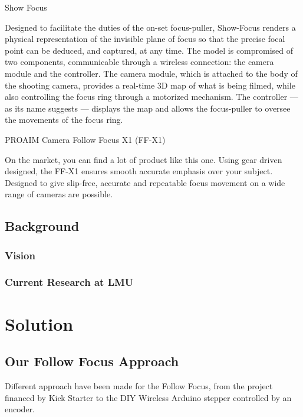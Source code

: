 \documentclass{sigchi}
\begin{document}
Show Focus

Designed to facilitate the duties of the on-set focus-puller, Show-Focus renders a physical representation of the invisible plane of focus so that the precise focal point can be deduced, and captured, at any time. The model is compromised of two components, communicable through a wireless connection: the camera module and the controller. The camera module, which is attached to the body of the shooting camera, provides a real-time 3D map of what is being filmed, while also controlling the focus ring through a motorized mechanism. The controller — as its name suggests — displays the map and allows the focus-puller to oversee the movements of the focus ring.

PROAIM Camera Follow Focus X1 (FF-X1)

On the market, you can find a lot of product like this one. Using gear driven designed, the FF-X1 ensures smooth accurate emphasis over your subject. Designed to give slip-free, accurate and repeatable focus movement on a wide range of cameras are possible.


\subsection{Background}

\subsubsection{Vision}

\subsubsection{Current Research at LMU}

\section{Solution}

\subsection{Our Follow Focus Approach}
Different approach have been made for the Follow Focus, from the project financed by Kick Starter to the DIY Wireless Arduino stepper controlled by an encoder. 
\end{document}
